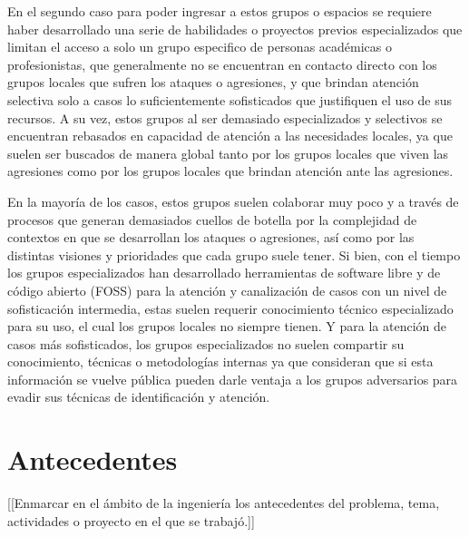 \documentclass[12pt]{caltech_thesis}
\begin{document}
En el segundo caso para poder ingresar a estos grupos o espacios se requiere haber desarrollado una serie de habilidades o proyectos previos especializados que limitan el acceso a solo un grupo especifico de personas académicas o profesionistas, que generalmente no se encuentran en contacto directo con los grupos locales que sufren los ataques o agresiones, y que brindan atención selectiva solo a casos lo suficientemente sofisticados que justifiquen el uso de sus recursos. A su vez, estos grupos al ser demasiado especializados y selectivos se encuentran rebasados en capacidad de atención a las necesidades locales, ya que suelen ser buscados de manera global tanto por los grupos locales que viven las agresiones como por los grupos locales que brindan atención ante las agresiones.

En la mayoría de los casos, estos grupos suelen colaborar muy poco y a través de procesos que generan demasiados cuellos de botella por la complejidad de contextos en que se desarrollan los ataques o agresiones, así como por las distintas visiones y prioridades que cada grupo suele tener. Si bien, con el tiempo los grupos especializados han desarrollado herramientas de software libre  y de código abierto  (FOSS)  para la atención y canalización de casos con un nivel de sofisticación intermedia, estas suelen requerir conocimiento técnico especializado para su uso, el cual los grupos locales no siempre tienen. Y para la atención de casos más sofisticados, los grupos especializados no suelen compartir su conocimiento, técnicas o metodologías internas ya que consideran que si esta información se vuelve pública pueden darle ventaja a los grupos adversarios para evadir sus técnicas de identificación y atención.


\chapter{Antecedentes}

[[Enmarcar en el ámbito de la ingeniería los antecedentes del problema, tema, actividades o proyecto en el que se trabajó.]]
\end{document}
